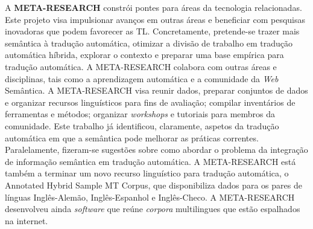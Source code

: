 \documentclass[]{../metanetpaper}
\begin{document}
\begin{multicols}{2}
A   \textbf{META-RESEARCH} constrói pontes para áreas da tecnologia relacionadas. Este projeto visa impulsionar avanços em outras áreas e beneficiar com pesquisas inovadoras que podem favorecer as TL. Concretamente, pretende-se trazer mais semântica à tradução automática, otimizar a divisão de trabalho em tradução automática híbrida, explorar o contexto e preparar uma base empírica para tradução automática. A META-RESEARCH colabora com outras áreas e disciplinas, tais como a aprendizagem automática e a comunidade da \textit{Web} Semântica. A META-RESEARCH visa reunir dados, preparar conjuntos de dados e organizar recursos linguísticos para fins de avaliação; compilar inventários de ferramentas e métodos; organizar \textit{workshops} e tutoriais para membros da comunidade. Este trabalho já identificou, claramente, aspetos da tradução automática em que a semântica pode melhorar as práticas correntes. Paralelamente, fizeram-se sugestões sobre como abordar o problema da integração de informação semântica em tradução automática. A META-RESEARCH está também a terminar um novo recurso linguístico para tradução automática, o Annotated Hybrid Sample MT Corpus, que disponibiliza dados para os pares de línguas Inglês-Alemão, Inglês-Espanhol e Inglês-Checo. A META-RESEARCH desenvolveu ainda \textit{software} que reúne \textit{corpora} multilingues que estão espalhados na internet.
\end{multicols}


\setcounter{section}{0}
\setcounter{figure}{0}

\cleardoublepage


\end{document}
